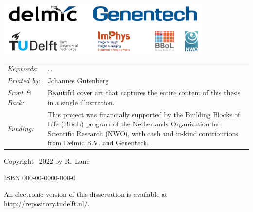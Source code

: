 \begin{titlepage}
\begin{tabular}{p{4cm}l}
\end{tabular}


\vfill
\begin{center}
    \includegraphics[height=2.7cm]{title/logos/logos_v1.pdf}
\end{center}
\vfill

\noindent
\begin{tabular}{@{}p{}@{}p{}}
    \textit{Keywords:} & \ldots \\[\medskipamount]
    \textit{Printed by:} & Johannes Gutenberg \\[\medskipamount]
    \textit{Front \& Back:} & Beautiful cover art that captures the entire content of this thesis in a single illustration. \\[\medskipamount]
    \textit{Funding:} & This project was financially supported by the Building Blocks of Life (BBoL) program of the Netherlands Organization for Scientific Research (NWO), with cash and in-kind contributions from Delmic B.V. and Genentech.
\end{tabular}

\vspace{4\bigskipamount}

\noindent Copyright \textcopyright\ 2022 by R.~Lane


\medskip
\noindent ISBN 000-00-0000-000-0

\medskip
\noindent An electronic version of this dissertation is available at \\
\url{http://repository.tudelft.nl/}.

\end{titlepage}

